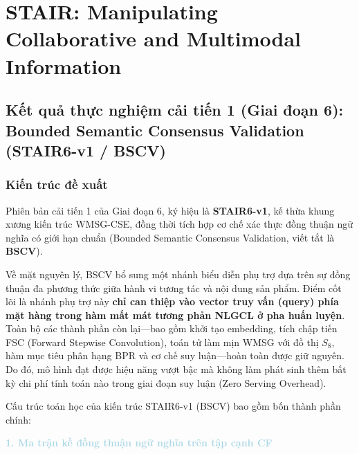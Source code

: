 \section{STAIR: Manipulating Collaborative and Multimodal Information}

\subsection{Kết quả thực nghiệm cải tiến 1 (Giai đoạn 6): Bounded Semantic Consensus Validation (STAIR6-v1 / BSCV)}

\subsubsection{Kiến trúc đề xuất}

Phiên bản cải tiến 1 của Giai đoạn 6, ký hiệu là \textbf{STAIR6-v1}, kế thừa khung xương kiến trúc WMSG-CSE, đồng thời tích hợp cơ chế xác thực đồng thuận ngữ nghĩa có giới hạn chuẩn (Bounded Semantic Consensus Validation, viết tắt là \textbf{BSCV}). 

Về mặt nguyên lý, BSCV bổ sung một nhánh biểu diễn phụ trợ dựa trên sự đồng thuận đa phương thức giữa hành vi tương tác và nội dung sản phẩm. Điểm cốt lõi là nhánh phụ trợ này \textbf{chỉ can thiệp vào vector truy vấn (query) phía mặt hàng trong hàm mất mát tương phản NLGCL ở pha huấn luyện}. Toàn bộ các thành phần còn lại—bao gồm khởi tạo embedding, tích chập tiến FSC (Forward Stepwise Convolution), toán tử làm mịn WMSG với đồ thị $S_8$, hàm mục tiêu phân hạng BPR và cơ chế suy luận—hoàn toàn được giữ nguyên. Do đó, mô hình đạt được hiệu năng vượt bậc mà không làm phát sinh thêm bất kỳ chi phí tính toán nào trong giai đoạn suy luận (Zero Serving Overhead).

Cấu trúc toán học của kiến trúc STAIR6-v1 (BSCV) bao gồm bốn thành phần chính:

\noindent\textcolor{lightblue}{\textbf{1. Ma trận kề đồng thuận ngữ nghĩa trên tập cạnh CF}}


